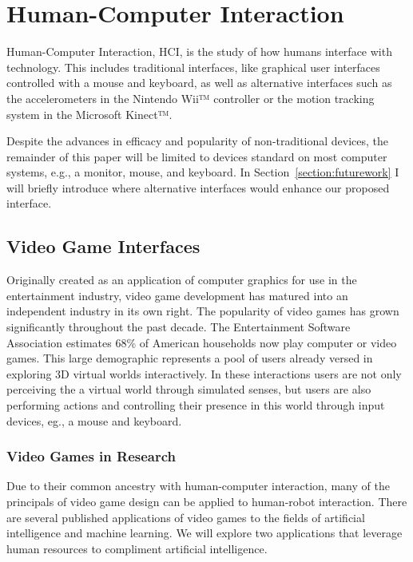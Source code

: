 \chapter{Human-Computer Interaction} %
\label{chapter:hci}
Human-Computer Interaction, HCI, is the study of how humans interface with technology. This includes traditional interfaces, like graphical user interfaces controlled with a mouse and keyboard, as well as alternative interfaces such as the accelerometers in the Nintendo Wii™ controller or the motion tracking system in the Microsoft Kinect™.

Despite the advances in efficacy and popularity of non-traditional devices, the remainder of this paper will be limited to devices standard on most computer systems, e.g., a monitor, mouse, and keyboard. In Section~\ref{section:futurework} I will briefly introduce where alternative interfaces would enhance our proposed interface.

\section{Video Game Interfaces} %
\label{sec:video_game_interfaces}
Originally created as an application of computer graphics for use in the entertainment industry, video game development has matured into an independent industry in its own right. The popularity of video games has grown significantly throughout the past decade. The Entertainment Software Association estimates 68\% of American households now play computer or video games. \cite{ESA} This large demographic represents a pool of users already versed in exploring 3D virtual worlds interactively. In these interactions users are not only perceiving the a virtual world through simulated senses, but users are also performing actions and controlling their presence in this world through input devices, eg., a mouse and keyboard.

\subsection{Video Games in Research} %
\label{sub:video_games_in_research}
Due to their common ancestry with human-computer interaction, many of the principals of video game design can be applied to human-robot interaction. There are several published applications of video games to the fields of artificial intelligence and machine learning. We will explore two applications that leverage human resources to compliment artificial intelligence.

